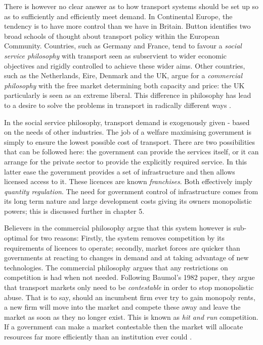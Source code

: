 There is however no clear answer as to how transport systems should be set up so as to sufficiently and efficiently meet demand. In Continental Europe, the tendency is to have more control than we have in Britain. Button identifies two broad schools of thought about transport policy within the European Community. Countries, such as Germany and France, tend to favour a \textit{social service philosophy} with transport seen as subservient to wider economic objectives and rigidly controlled to achieve these wider aims. Other countries, such as the Netherlands, Eire, Denmark and the UK, argue for a \textit{commercial philosophy} with the free market determining both capacity and price: the UK particularly is seen as an extreme liberal. This difference in philosophy has lead to a desire to solve the problems in transport in radically different ways \citep{Button:1993}.

In the social service philosophy, transport demand is exogenously given - based on the needs of other industries. The job of a welfare maximising government is simply to ensure the lowest possible cost of transport. There are two possibilities that can be followed here: the government can provide the services itself, or it can arrange for the private sector to provide the explicitly required service. In this latter ease the government provides a set of infrastructure and then allows licensed access to it. These licences are known \textit{franchises}. Both effectively imply \textit{quantity regulation}. The need for government control of infrastructure comes from its long term nature and large development costs giving its owners monopolistic powers; this is discussed further in chapter 5.

Believers in the commercial philosophy argue that this system however is sub-optimal for two reasons: Firstly, the system removes competition by its requirements of licences to operate; secondly, market forces are quicker than governments at reacting to changes in demand and at taking advantage of new technologies. The commercial philosophy argues that any restrictions on competition is had when not needed. Following Baumol's 1982 paper, they argue that transport markets only need to be \textit{contestable} in order to stop monopolistic abuse. That is to say, should an incumbent firm ever try to gain monopoly rents, a new firm will move into the market and compete these away and leave the market as soon as they no longer exist. This is known as \textit{hit and run} competition. If a government can make a market contestable then the market will allocate resources far more efficiently than an institution ever could \citep{Baumol:1982}.

